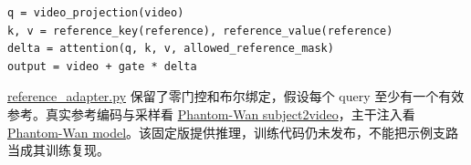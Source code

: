 \begin{verbatim}
q = video_projection(video)
k, v = reference_key(reference), reference_value(reference)
delta = attention(q, k, v, allowed_reference_mask)
output = video + gate * delta
\end{verbatim}

\hyperref[code-reference-adapter]{reference\_adapter.py} 保留了零门控和布尔绑定，假设每个 query 至少有一个有效参考。真实参考编码与采样看 \href{https://github.com/Phantom-video/Phantom/blob/bd84b602dcc949e23c89cbbf266b6f5975f2f025/phantom_wan/subject2video.py}{Phantom-Wan subject2video}，主干注入看 \href{https://github.com/Phantom-video/Phantom/blob/bd84b602dcc949e23c89cbbf266b6f5975f2f025/phantom_wan/modules/model.py}{Phantom-Wan model}。该固定版提供推理，训练代码仍未发布，不能把示例支路当成其训练复现。
